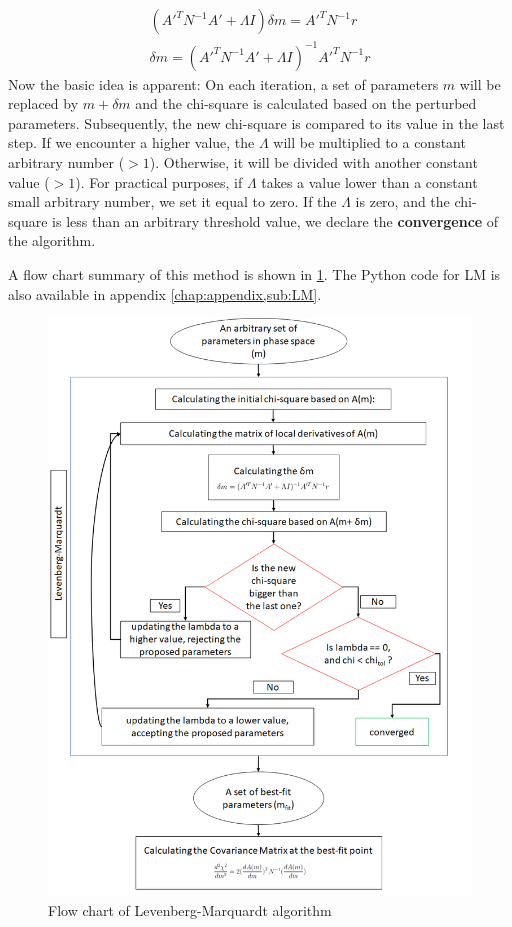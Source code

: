 \documentclass[12pt, TexShade, letterpaper]{report}
\begin{document}
\begin{gather}
    (A'^{T} N^{-1}A' + \Lambda I)\delta m = A'^T N^{-1} r\\
    \delta m = (A'^{T} N^{-1}A' + \Lambda I)^{-1} A'^T N^{-1} r
\end{gather}
Now the basic idea is apparent: On each iteration, a set of parameters $m$ will be replaced by $m+\delta m$ and the chi-square is calculated based on the perturbed parameters. Subsequently, the new chi-square is compared to its value in the last step. If we encounter a higher value, the $\Lambda$ will be multiplied to a constant arbitrary number ($>1$). Otherwise, it will be divided with another constant value ($>1$). For practical purposes, if $\Lambda$ takes a value lower than a constant small arbitrary number, we set it equal to zero. If the $\Lambda$ is zero, and the chi-square is less than an arbitrary threshold value, we declare the \textbf{convergence} of the algorithm.\par
A flow chart summary of this method is shown in \ref{fig:LM_flow}. The Python code for LM is also available in appendix \ref{chap:appendix,sub:LM}.
\begin{figure}[h!]
\centering
\includegraphics[scale =0.9]{LM_flow.png}
\caption{Flow chart of Levenberg-Marquardt algorithm}
\label{fig:LM_flow}
\end{figure}
\end{document}

